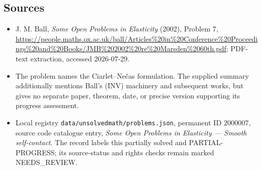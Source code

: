 \documentclass[11pt]{article}
\begin{document}
\subsection{Sources}
\begin{itemize}
\item J. M. Ball, \emph{Some Open Problems in Elasticity} (2002), Problem 7, \url{https://people.maths.ox.ac.uk/ball/Articles%20in%20Conference%20Proceedings%20and%20Books/JMB%202002%20re%20Marsden%2060th.pdf}; PDF-text extraction, accessed 2026-07-29.
\item The problem names the Ciarlet--Ne\v{c}as formulation. The supplied summary additionally mentions Ball's (INV) machinery and subsequent works, but gives no separate paper, theorem, date, or precise version supporting its progress assessment.
\item Local registry \texttt{data/unsolvedmath/problems.json}, permanent ID $2000007$, source code catalogue entry, \emph{Some Open Problems in Elasticity --- Smooth self-contact}. The record labels this partially solved and PARTIAL-PROGRESS; its source-status and rights checks remain marked NEEDS\_REVIEW.
\end{itemize}
\end{document}
